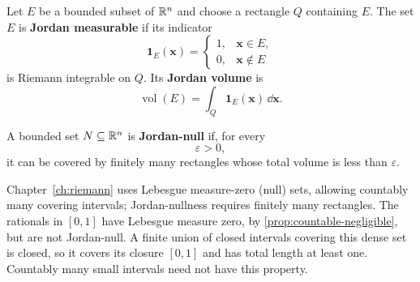 \begin{definition}
Let $E$ be a bounded subset of $\mathbb{R}^n$ and choose a rectangle $Q$ containing
$E$.  The set $E$ is \textbf{Jordan measurable} if its indicator
\[
\mathbf 1_E(\mathbf{x})=
\begin{cases}
1,&\mathbf{x}\in E,\\
0,&\mathbf{x}\notin E
\end{cases}
\]
is Riemann integrable on $Q$.  Its \textbf{Jordan volume} is
\[
\operatorname{vol}(E)=\int_Q\mathbf 1_E(\mathbf{x})\,\dd\mathbf{x}.
\]
\end{definition}

\begin{definition}
A bounded set \(N\subseteq\mathbb{R}^n\) is \textbf{Jordan-null} if, for every
\[
\varepsilon>0,
\]
it can be covered by finitely many rectangles whose total volume is less
than \(\varepsilon\).
\end{definition}

Chapter~\ref{ch:riemann} uses Lebesgue measure-zero (null) sets,
allowing countably many covering intervals;
Jordan-nullness requires finitely many rectangles. The rationals in $[0,1]$
have Lebesgue measure zero, by \cref{prop:countable-negligible},
but are not Jordan-null. A finite union of closed intervals covering this
dense set is closed, so it covers its closure $[0,1]$ and has total length
at least one. Countably many small intervals need not have this property.

